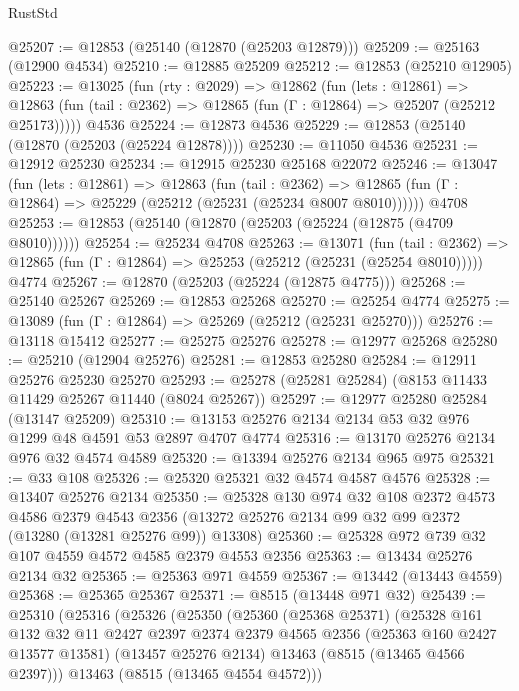 \begin{lexlean}{RustStd}
\begin{coremodule}
@25207 := @12853 (@25140 (@12870 (@25203 @12879)))
@25209 := @25163 (@12900 @4534)
@25210 := @12885 @25209
@25212 := @12853 (@25210 @12905)
@25223 := @13025
    (fun (rty : @2029) =>
    @12862
      (fun (lets : @12861) =>
      @12863 (fun (tail : @2362) => @12865 (fun (Γ : @12864) => @25207 (@25212 @25173)))))
    @4536
@25224 := @12873 @4536
@25229 := @12853 (@25140 (@12870 (@25203 (@25224 @12878))))
@25230 := @11050 @4536
@25231 := @12912 @25230
@25234 := @12915 @25230 @25168 @22072
@25246 := @13047
    (fun (lets : @12861) =>
    @12863
      (fun (tail : @2362) =>
      @12865 (fun (Γ : @12864) => @25229 (@25212 (@25231 (@25234 @8007 @8010))))))
    @4708
@25253 := @12853 (@25140 (@12870 (@25203 (@25224 (@12875 (@4709 @8010))))))
@25254 := @25234 @4708
@25263 := @13071
    (fun (tail : @2362) => @12865 (fun (Γ : @12864) => @25253 (@25212 (@25231 (@25254 @8010)))))
    @4774
@25267 := @12870 (@25203 (@25224 (@12875 @4775)))
@25268 := @25140 @25267
@25269 := @12853 @25268
@25270 := @25254 @4774
@25275 := @13089 (fun (Γ : @12864) => @25269 (@25212 (@25231 @25270)))
@25276 := @13118 @15412
@25277 := @25275 @25276
@25278 := @12977 @25268
@25280 := @25210 (@12904 @25276)
@25281 := @12853 @25280
@25284 := @12911 @25276 @25230 @25270
@25293 := @25278 (@25281 @25284) (@8153 @11433 @11429 @25267 @11440 (@8024 @25267))
@25297 := @12977 @25280 @25284 (@13147 @25209)
@25310 := @13153 @25276 @2134 @2134 @53 @32 @976 @1299 @48 @4591 @53 @2897 @4707 @4774
@25316 := @13170 @25276 @2134 @976 @32 @4574 @4589
@25320 := @13394 @25276 @2134 @965 @975
@25321 := @33 @108
@25326 := @25320 @25321 @32 @4574 @4587 @4576
@25328 := @13407 @25276 @2134
@25350 := @25328
    @130
    @974
    @32
    @108
    @2372
    @4573
    @4586
    @2379
    @4543
    @2356
    (@13272 @25276 @2134 @99 @32 @99 @2372 (@13280 (@13281 @25276 @99)) @13308)
@25360 := @25328 @972 @739 @32 @107 @4559 @4572 @4585 @2379 @4553 @2356
@25363 := @13434 @25276 @2134 @32
@25365 := @25363 @971 @4559
@25367 := @13442 (@13443 @4559)
@25368 := @25365 @25367
@25371 := @8515 (@13448 @971 @32)
@25439 := @25310
    (@25316
      (@25326
        (@25350
          (@25360
            (@25368 @25371)
            (@25328
              @161
              @132
              @32
              @11
              @2427
              @2397
              @2374
              @2379
              @4565
              @2356
              (@25363 @160 @2427 @13577 @13581)
              (@13457 @25276 @2134)
              @13463
              (@8515 (@13465 @4566 @2397)))
            @13463
            (@8515 (@13465 @4554 @4572)))

\end{coremodule}
\end{lexlean}

